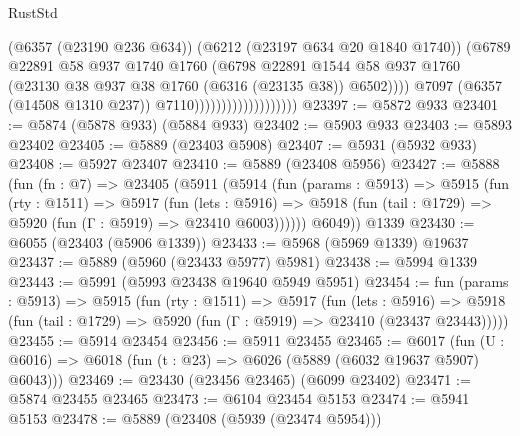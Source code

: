 \begin{lexlean}{RustStd}
\begin{coremodule}
                                            (@6357 (@23190 @236 @634))
                                            (@6212 (@23197 @634 @20 @1840 @1740))
                                            (@6789
                                              @22891
                                              @58
                                              @937
                                              @1740
                                              @1760
                                              (@6798
                                                @22891
                                                @1544
                                                @58
                                                @937
                                                @1760
                                                (@23130
                                                  @38
                                                  @937
                                                  @38
                                                  @1760
                                                  (@6316 (@23135 @38))
                                                  @6502))))
                                          @7097
                                          (@6357 (@14508 @1310 @237))
                                          @7110)))))))))))))))))))
@23397 := @5872 @933
@23401 := @5874 (@5878 @933) (@5884 @933)
@23402 := @5903 @933
@23403 := @5893 @23402
@23405 := @5889 (@23403 @5908)
@23407 := @5931 (@5932 @933)
@23408 := @5927 @23407
@23410 := @5889 (@23408 @5956)
@23427 := @5888
    (fun (fn : @7) =>
    @23405
      (@5911
        (@5914
          (fun (params : @5913) =>
          @5915
            (fun (rty : @1511) =>
            @5917
              (fun (lets : @5916) =>
              @5918 (fun (tail : @1729) => @5920 (fun (Γ : @5919) => @23410 @6003))))))
        @6049))
    @1339
@23430 := @6055 (@23403 (@5906 @1339))
@23433 := @5968 (@5969 @1339) @19637
@23437 := @5889 (@5960 (@23433 @5977) @5981)
@23438 := @5994 @1339
@23443 := @5991 (@5993 @23438 @19640 @5949 @5951)
@23454 := fun (params : @5913) =>
  @5915
    (fun (rty : @1511) =>
    @5917
      (fun (lets : @5916) =>
      @5918 (fun (tail : @1729) => @5920 (fun (Γ : @5919) => @23410 (@23437 @23443)))))
@23455 := @5914 @23454
@23456 := @5911 @23455
@23465 := @6017
    (fun (U : @6016) => @6018 (fun (t : @23) => @6026 (@5889 (@6032 @19637 @5907) @6043)))
@23469 := @23430 (@23456 @23465) (@6099 @23402)
@23471 := @5874 @23455 @23465
@23473 := @6104 @23454 @5153
@23474 := @5941 @5153
@23478 := @5889 (@23408 (@5939 (@23474 @5954)))

\end{coremodule}
\end{lexlean}
